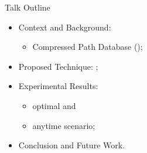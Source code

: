     

\begin{frame}{Talk Outline}
    \begin{itemize}
        \item Context and Background:
        \begin{itemize}
            \item Compressed Path Database (\CPD{});
        \end{itemize}
        \item Proposed Technique: \CPDSearch{};
        \item Experimental Results: 
            \begin{itemize}
                \item optimal and 
                \item anytime scenario;
            \end{itemize}
        \item Conclusion and Future Work.
    \end{itemize}
\end{frame}